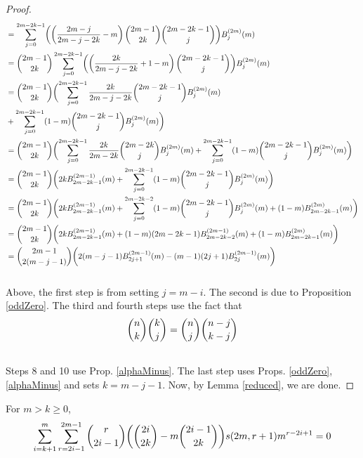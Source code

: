 \documentclass[fleqn,a4paper,9pt]{article}
\begin{document}
\begin{flushleft}
\begin{proof}
\begin{align}
&=\sum_{j=0}^{2m-2k-1} \biggl(\left(\frac{2m-j}{2m-j-2k}-m\right)\binom{2m-1}{2k}\binom{2m-2k-1}{j}\biggr)B_{j}^{(2m)}(m)\\\notag
&=\binom{2m-1}{2k}\sum_{j=0}^{2m-2k-1} \biggl(\left(\frac{2k}{2m-j-2k}+1-m\right)\binom{2m-2k-1}{j}\biggr)B_{j}^{(2m)}(m)\\\notag
&=\binom{2m-1}{2k}\biggl(\sum_{j=0}^{2m-2k-1} \frac{2k}{2m-j-2k}\binom{2m-2k-1}{j}B_{j}^{(2m)}(m)\\\notag
&+\sum_{j=0}^{2m-2k-1} (1-m)\binom{2m-2k-1}{j}B_{j}^{(2m)}(m)\biggr)\\\notag
&=\binom{2m-1}{2k}\biggl(\sum_{j=0}^{2m-2k-1} \frac{2k}{2m-2k}\binom{2m-2k}{j}B_{j}^{(2m)}(m)+\sum_{j=0}^{2m-2k-1} (1-m)\binom{2m-2k-1}{j}B_{j}^{(2m)}(m)\biggr)\\\notag
&=\binom{2m-1}{2k}\biggl(2k B_{2m-2k-1}^{(2m-1)}(m)+\sum_{j=0}^{2m-2k-1} (1-m)\binom{2m-2k-1}{j}B_{j}^{(2m)}(m)\biggr)\\\notag
&=\binom{2m-1}{2k}\biggl(2k B_{2m-2k-1}^{(2m-1)}(m)+\sum_{j=0}^{2m-2k-2} (1-m)\binom{2m-2k-1}{j}B_{j}^{(2m)}(m)+(1-m)B_{2m-2k-1}^{(2m)}(m)\biggr)\\\notag
&=\binom{2m-1}{2k}\biggl(2k B_{2m-2k-1}^{(2m-1)}(m)+(1-m)(2m-2k-1)B_{2m-2k-2}^{(2m-1)}(m)+(1-m)B_{2m-2k-1}^{(2m)}(m)\biggr)\\\notag
&=\binom{2m-1}{2(m-j-1)}\biggl(2(m-j-1) B_{2j+1}^{(2m-1)}(m)-(m-1)(2j+1)B_{2j}^{(2m-1)}(m)\biggr)\\\notag
\end{align}
Above, the first step is from setting $j=m-i$. The second is due to Proposition \ref{oddZero}. The third and fourth steps use the fact that
\begin{align}
\binom{n}{k}\binom{k}{j}&=\binom{n}{j}\binom{n-j}{k-j}\\\notag
\end{align}
Steps 8 and 10 use Prop. \ref{alphaMinus}. The last step uses Props. \ref{oddZero}, \ref{alphaMinus} and sets $k=m-j-1$.
Now, by Lemma \ref{reduced}, we are done.
\end{proof}
\begin{corollary}\label{stir}
For $m>k\ge 0$,
\begin{align}
\sum_{i=k+1}^m\sum_{r=2i-1}^{2m-1} \binom{r}{2i-1}\biggl(\binom{2i}{2k}-m\binom{2i-1}{2k}\biggr)s(2m,r+1)m^{r-2i+1}=0\\\notag
\end{align}


\end{corollary}
\end{flushleft}
\end{document}
